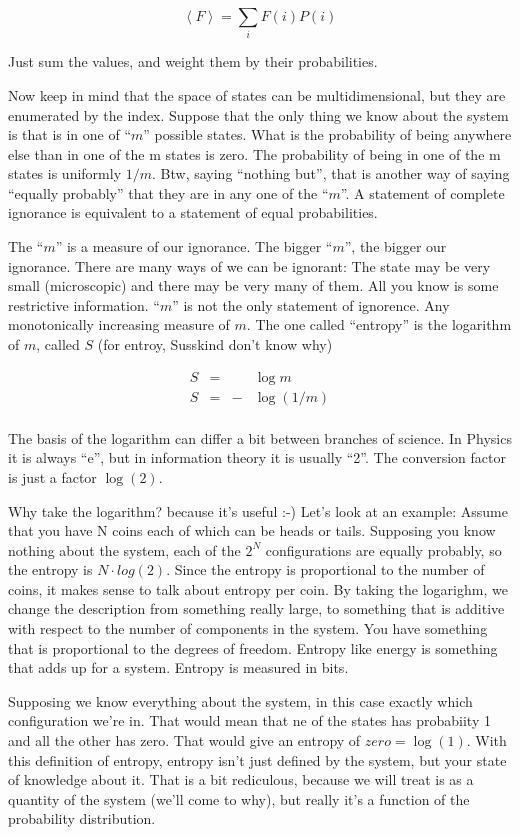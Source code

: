 \documentclass[a4, 12pt, english, USenglish]{scrreprt}
\newcommand{\ev}[1]{\ensuremath{\left\langle{}#1{}\right\rangle}}
\begin{document}
\[
  \ev{F} = \sum_i F(i) P(i)
\]

Just sum the values, and weight them by their probabilities.

Now keep in mind that the space of states can be multidimensional, but
they are enumerated by the index. Suppose that the only thing we know
about the system is that is in one of ``\(m\)'' possible states.  What is
the probability of being anywhere else than in one of the m states is
zero.   The probability of being in one of the m states is uniformly
\(1/m\).  Btw, saying ``nothing but'', that is another way of saying
``equally probably'' that they are in any one of the ``\(m\)''.  A
statement of complete ignorance is equivalent to  a statement of equal
probabilities.

The ``\(m\)'' is a measure of our ignorance. The bigger ``\(m\)'', the bigger
our ignorance.   There are many ways of we can be ignorant: The state
may be very small (microscopic)  and  there may be very many of them.
All you know is some restrictive information.   ``\(m\)'' is not the only
statement of ignorence.  Any monotonically increasing measure of \(m\).
The one called ``entropy'' is the logarithm of \(m\), called \(S\) (for
entroy, Susskind don't know why)

\[
\begin{array}{lccl}
S &=& &\log m \\
S&=& - &\log (1/m) \\
\end{array}
\]

The basis of the logarithm can differ a bit between branches of
science.  In Physics it is always ``e'', but in information theory it
is usually ``2''.  The conversion factor is just a factor \(\log(2)\).   

Why take the logarithm?  because it's useful :-)  Let's look at an
example: Assume that you have N coins each of which can be heads or
tails.  Supposing you know nothing about the system, each of the \(2^N\)
configurations are equally probably, so the entropy is \(N\cdot log(2)\).
Since the entropy is proportional to the number of coins, it makes
sense to talk about entropy per coin.  By taking the logarighm, we
change the description from something really large, to something that
is additive with respect to the number of components in the system.
You have something that is proportional to the degrees of
freedom. Entropy like energy is something that adds up for a system.
Entropy is measured in bits.

Supposing we know everything about the system, in this case exactly
which configuration we're in. That would mean that ne of the states
has probabiity 1 and all the other has zero.  That would give an
entropy of \(zero =\log(1)\).    With this definition of entropy, entropy
isn't just defined by the system, but your state of knowledge about
it.  That is a bit rediculous, because we will treat is as a quantity
of the system (we'll come to why), but really it's a function of the
probability distribution.
\end{document}
